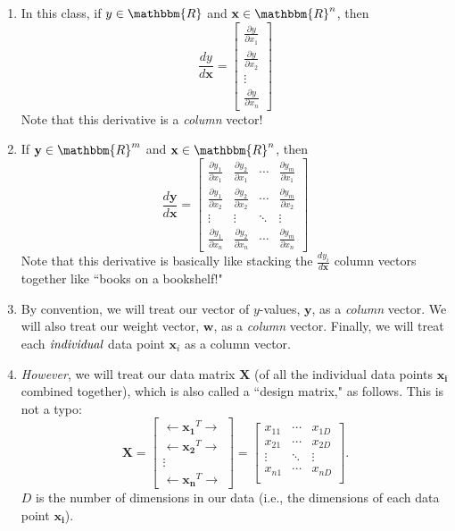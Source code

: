 \documentclass[11pt,letterpaper]{article}
\newcommand{\R}{\mathbbm{R}}
\begin{document}
\begin{enumerate}
    \item In this class, if $y \in \R$ and $\mathbf{x} \in \R^{n}$, then
    $$\frac{dy}{d\mathbf{x}} = \begin{bmatrix}
    \frac{\partial y}{\partial x_1} \\
    \frac{\partial y}{\partial x_2} \\
    \vdots \\
    \frac{\partial y}{\partial x_n}
    \end{bmatrix}$$
    Note that this derivative is a \emph{column} vector!
    \item If $\mathbf{y} \in \R^{m}$ and $\mathbf{x} \in \R^{n}$, then
    $$\frac{d\mathbf{y}}{d\mathbf{x}} = \begin{bmatrix}
    \frac{\partial y_1}{\partial x_1} & \frac{\partial y_2}{\partial x_1} & \cdots & \frac{\partial y_m}{\partial x_1} \\
    \frac{\partial y_1}{\partial x_2} & \frac{\partial y_2}{\partial x_2} & \cdots & \frac{\partial y_m}{\partial x_2} \\
    \vdots & \vdots & \ddots & \vdots \\
    \frac{\partial y_1}{\partial x_n} & \frac{\partial y_2}{\partial x_n} & \cdots & \frac{\partial y_m}{\partial x_n}
    \end{bmatrix}$$
    Note that this derivative is basically like stacking the $\frac{dy_i}{d\mathbf{x}}$ column vectors together like ``books on a bookshelf!"
    \item By convention, we will treat our vector of $y$-values, $\mathbf{y}$, as a \emph{column} vector. We will also treat our weight vector, $\mathbf{w}$, as a \emph{column} vector. Finally, we will treat each $\emph{individual}$ data point $\mathbf{x}_i$ as a column vector.
    \item \emph{However}, we will treat our data matrix $\mathbf{X}$ (of all the individual data points $\mathbf{x_i}$ combined together), which is also called a ``design matrix," as follows. This is not a typo:
    $$\mathbf{X} = \begin{bmatrix}
    \leftarrow\mathbf{x_1}^{T}\rightarrow \\
    \leftarrow\mathbf{x_2}^{T}\rightarrow \\
    \vdots \\
    \leftarrow\mathbf{x_n}^{T}\rightarrow
    \end{bmatrix} 
    =
    \begin{bmatrix}
    x_{11} & \cdots & x_{1D} \\
    x_{21} & \cdots & x_{2D} \\
    \vdots & \ddots & \vdots \\
    x_{n1} & \cdots & x_{nD} \\
    \end{bmatrix}.$$
    $D$ is the number of dimensions in our data (i.e., the dimensions of each data point $\mathbf{x_i}$).
    
\end{enumerate}
\end{document}
